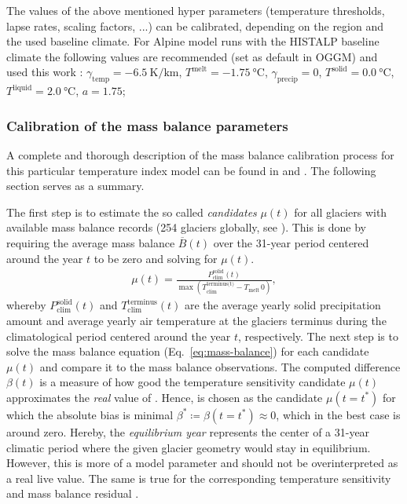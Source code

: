         The values of the above mentioned hyper parameters (temperature thresholds, lapse rates, scaling factors, ...) can be calibrated, depending on the region and the used baseline climate. For Alpine model runs with the HISTALP baseline climate the following values are recommended (set as default in OGGM) and used this work \citep{Dusch2018}: $\gamma_\text{temp} = \SI{-6.5}{\kelvin\per\kilo\meter}$, $T^\text{melt} = \SI{-1.75}{\celsius}$, $\gamma_\text{precip} = 0$, $T^\text{solid} = \SI{0.0}{\celsius}$, $T^\text{liquid} = \SI{2.0}{\celsius}$, $a = 1.75$;

        \subsubsection{Calibration of the mass balance parameters}\label{ssub:mb-calib}

            A complete and thorough description of the mass balance calibration process for this particular temperature index model can be found in \citet[Section 2.1.9, 2.1.10]{Marzeion2012b} and \citet[][Section 3.3]{Maussion2019}. The following section serves as a summary.
            
            The first step is to estimate the so called \emph{candidates} $\mu(t)$ for all glaciers with available mass balance records (254 glaciers globally, see \citet{WGMS2017}). This is done by requiring the average mass balance $\overline B(t)$ over the 31-year period centered around the year $t$ to be zero and solving for $\mu(t)$.
            \begin{align}\label{eq:mu-candidates}
                \mu(t) = \frac{P_\text{clim}^\text{solid}(t)}{\max(T_\text{clim}^\text{terminus(t)} - T_\text{melt}\, 0)},
            \end{align}
            whereby $P_{\text{clim}}^{\text{solid}}(t)$ and $T_{\text{clim}}^{\text{terminus}}(t)$ are the average yearly solid precipitation amount and average yearly air temperature at the glaciers terminus during the climatological period centered around the year $t$, respectively. The next step is to solve the mass balance equation (Eq.~\ref{eq:mass-balance}) for each candidate $\mu(t)$ and compare it to the mass balance observations. The computed difference $\beta(t)$ is a measure of how good the temperature sensitivity candidate $\mu(t)$ approximates the \textit{real} value of \mustar{}. Hence, \mustar{} is chosen as the candidate $\mu(t = t^*)$ for which the absolute bias is minimal $\beta^* \coloneqq \beta(t = t^*) \approx 0$, which in the best case is around zero. Hereby, the \textit{equilibrium year} \tstar{} represents the center of a 31-year climatic period where the given glacier geometry would stay in equilibrium. However, this is more of a model parameter and should not be overinterpreted as a real live value. The same is true for the corresponding temperature sensitivity \mustar{} and mass balance residual \bias{}.

